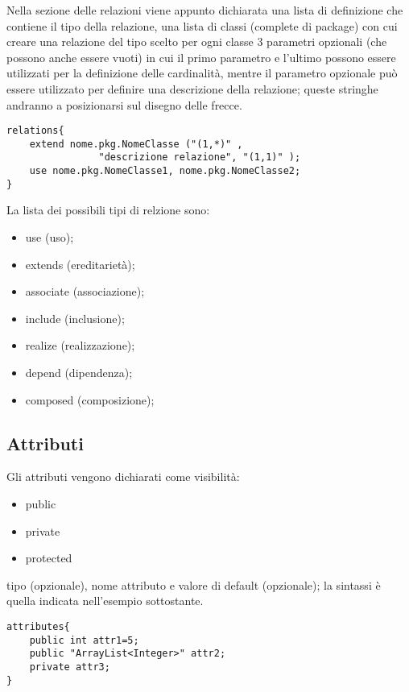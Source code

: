Nella sezione delle relazioni
viene appunto dichiarata una lista di definizione che contiene il tipo della 
relazione, una lista di classi (complete di package) 
con cui creare una relazione del tipo scelto
per ogni classe 3 parametri opzionali (che possono anche essere vuoti) in cui
il primo parametro e l'ultimo possono essere utilizzati per la definizione delle
cardinalità, mentre il parametro opzionale può essere utilizzato per definire
una descrizione della relazione; queste stringhe andranno a posizionarsi sul 
disegno delle frecce.

\begin{lstlisting}[caption={Dichiarazione di relazione}, style={model}]
relations{
	extend nome.pkg.NomeClasse ("(1,*)" , 
				"descrizione relazione", "(1,1)" );
	use nome.pkg.NomeClasse1, nome.pkg.NomeClasse2;
}
\end{lstlisting}

La lista dei possibili tipi di relzione sono:
\begin{itemize}
  \item{use (uso);}
  \item{extends (ereditarietà);}
  \item{associate (associazione);}
  \item{include (inclusione);}
  \item{realize (realizzazione);}
  \item{depend (dipendenza);}
  \item{composed (composizione);}
\end{itemize}

\subsection{Attributi}

Gli attributi vengono dichiarati come visibilità:
\begin{itemize}
  \item public
  \item private
  \item protected
\end{itemize}

tipo (opzionale), nome attributo e valore di default (opzionale); la sintassi è
quella indicata nell'esempio sottostante.

\begin{lstlisting}[caption={Dichiarazione di attributi}, style={model}]
attributes{
	public int attr1=5;
	public "ArrayList<Integer>" attr2;
	private attr3;
}
\end{lstlisting}

